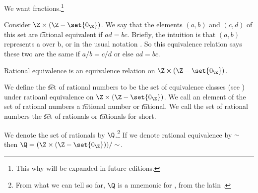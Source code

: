 

We want fractions.\footnote{This why will be expanded in future editions.}


Consider $\Z \times (\Z - \set{0_{\Z}})$.
We say that the elements $(a, b)$ and $(c, d)$ of this set are \t{rational equivalent} if $ad = bc$.
Brieﬂy, the intuition is that $(a, b)$ represents a over b, or in the usual notation .
So this equivalence relation says these two are the same if $a/b = c/d$ or else $ad= bc$.

\begin{proposition}
  Rational equivalence is an equivalence relation on $\Z \times (\Z - \set{0_{\Z}})$.
\end{proposition}

We define the \t{set of rational numbers} to be the set of equivalence classes (see ) under ratioanl equivalence on $\Z \times (\Z - \set{0_{\Z}})$.
We call an element of the set of rational numbers a \t{rational number} or \t{rational}.
We call the set of rational numbers the \t{set of rationals} or \t{rationals} for short.


We denote the set of rationals by $\Q$.\footnote{From what we can tell so far, $\Q$ is a mnemonic for , from the latin .}
If we denote rational equivalence by $\sim$ then $\Q = (\Z \times (\Z - \set{0_{\Z}}))/\sim$.


\blankpage
